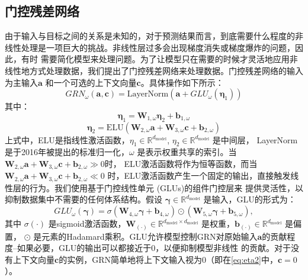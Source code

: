 \subsection{门控残差网络}
\label{cha:GRN}
由于输入与目标之间的关系是未知的，对于预测结果而言，到底需要什么程度的非线性处理是一项巨大的挑战。非线性层过多会出现梯度消失或梯度爆炸的问题，因此，有时
需要简化模型来处理问题。为了让模型只在需要的时候才灵活地应用非线性地方式处理数据，我们提出了门控残差网络来处理数据。门控残差网络的输入为主输入$\mathbf{a}$
和一个可选的上下文向量$\mathbf{c}$。具体操作如下所示：
\begin{equation}
    GRN_{\omega}(\mathbf{a}, \mathbf{c}) = \text{LayerNorm}(\mathbf{a} + GLU_{\omega}(\boldsymbol{\eta}_1))
\end{equation}
其中：
\begin{equation}
    \boldsymbol{\eta}_1 = \mathbf{W}_{1,\omega} \boldsymbol{\eta}_2 + \mathbf{b}_{1,\omega}
\end{equation}
\begin{equation}
    \boldsymbol{\eta}_2 = \text{ELU}(\mathbf{W}_{2,\omega} \mathbf{a} + \mathbf{W}_{3,\omega} \mathbf{c} + \mathbf{b}_{2,\omega})
    \label{eq:eta2}
\end{equation}
上式中，ELU是指线性激活函数，$\eta_1 \in \mathbb{R}^{d_{\text{model}}}$, $\eta_2 \in \mathbb{R}^{d_{\text{model}}}$ 是中间层，
LayerNorm是于2016年被提出的标准归一化，$\omega$ 是表示权重共享的索引。当$\mathbf{W}_{2,\omega} \mathbf{a} + \mathbf{W}_{3,\omega} \mathbf{c} + \mathbf{b}_{2,\omega} \gg 0$时，
ELU激活函数将作为恒等函数，而当$\mathbf{W}_{2,\omega} \mathbf{a} + \mathbf{W}_{3,\omega} \mathbf{c} + \mathbf{b}_{2,\omega} \ll 0$ 时，ELU激活函数产生一个固定的输出，直接触发线性层的行为。我们使用基于门控线性单元 (GLUs)的组件门控层来
提供灵活性，以抑制数据集中不需要的任何体系结构。假设 $\boldsymbol{\gamma } \in \mathbb{R}^{d_{\text{model}}}$ 是输入，GLU的形式为：
\begin{equation}
    GLU_{\omega}(\boldsymbol{\gamma }) = \sigma(\mathbf{W}_{4,\omega} \mathbf{\boldsymbol{\gamma }} + \mathbf{b}_{4,\omega}) \odot (\mathbf{W}_{5,\omega} \mathbf{\boldsymbol{\gamma }} + \mathbf{b}_{5,\omega}),
\end{equation}
其中 $\sigma(\cdot)$ 是sigmoid激活函数，$\mathbf{W}_{(\cdot)} \in \mathbb{R}^{d_{\text{model}} \times d_{\text{model}}}$ 是权重，$\mathbf{b}_{(\cdot)} \in \mathbb{R}^{d_{\text{model}}}$ 是偏置，
$\odot $ 是元素的Hadamard乘积。GLU允许模型控制GRN对原始输入$\mathbf{a}$的贡献程度--如果必要，GLU的输出可以都接近于0，以便抑制模型非线性
的贡献。对于没有上下文向量$\mathbf{c}$的实例，GRN简单地将上下文输入视为0（即在\eqref{eq:eta2}中，$\mathbf{c}=0$）。
